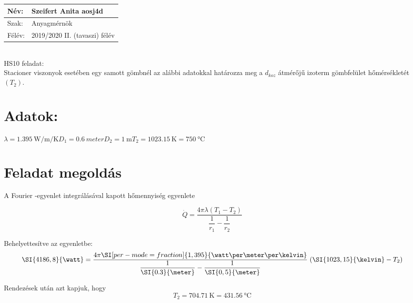 \begin{tabular}{ | p{2cm} | p{14cm} | } 
	\hline
	Név: &Szeifert Anita aosj4d\\ 
	\hline
	Szak: & Anyagmérnök \\ 
	\hline
	Félév: & 2019/2020 II. (tavaszi) félév \\ 
\hline
\end{tabular}
\vspace{5mm}
\\HS10 feladat:\\
Stacioner viszonyok esetében egy samott gömbnél az alábbi adatokkal határozza meg a $d_{koz}$ átmérőjű izoterm gömbfelület hőmérsékletét $(T_2)$.
\section*{ {Adatok:}}

$
\lambda=\SI[per-mode=fraction]{1,395}{\watt\per\meter\per\kelvin}D_1 =\SI{0,6}{meter} D_2 =\SI{1}{\meter} T_2=\SI{1023,15}{\kelvin}=\SI{750}{\degreeCelsius}
$
\vspace{1mm}
\section {Feladat megoldás}

A Fourier -egyenlet integrálásával kapott hőmennyiség egyenlete

\begin{equation}
	\dot{Q}=\dfrac{4\pi \lambda(T_1-T_2)}{\dfrac{1}{r_1}-\dfrac{1}{r_2}}
\end{equation}

\vspace{10mm}
Behelyettesítve az egyenletbe:
\begin{equation}
\SI{4186,8}{\watt}=\dfrac{4\pi\SI[per-mode=fraction]{1,395}{\watt\per\meter\per\kelvin}}
{\dfrac{1}{\SI{0.3}{\meter}}-\dfrac{1}{\SI{0,5}{\meter}}}
\hspace{1mm} (\SI{1023,15}{\kelvin}-T_2)
\end{equation}

Rendezések után azt kapjuk, hogy 
\begin{equation*}
    T_2=\SI{704,71}{\kelvin}=\SI{431,56}{\degreeCelsius}
\end{equation*}
   

